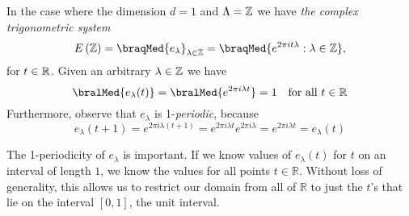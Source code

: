 \documentclass[../thesis.tex]{subfiles}
\begin{document}
\begin{example}
    In the case where the dimension $d=1$ and $\Lambda = \mathbb{Z}$ we have \emph{the complex trigonometric system}
    \begin{equation}
        E\brac{\Z} = \braqMed{e_\lambda}_{\lambda \in \Z} = \braqMed{e^{2\pi i t \lambda} : \lambda \in \Z}, %
    \end{equation}
    for $t\in \mathbb{R}$. Given an arbitrary $\lambda \in \mathbb{Z}$ we have
    \begin{equation}
        \bralMed{e_{\lambda}(t) }= \bralMed{e^{2 \pi i \lambda t}} = 1 \quad \text{for all } t\in \R
    \end{equation}
    Furthermore, observe that $e_\lambda$ is 1-\emph{periodic}, because
    \begin{equation}
        e_\lambda(t+1) = e^{2 \pi i \lambda (t+1)} = e^{2 \pi i \lambda t} e^{2 \pi i \lambda} = e^{2 \pi i \lambda t} = e_\lambda(t)
    \end{equation}

    The 1-periodicity of $e_\lambda$ is important. If we know values of $e_\lambda(t)$ for $t$ on an interval of length $1$, we know the values for all points $t\in \mathbb{R}$. Without loss of generality, this allows us to restrict our domain from all of $\mathbb{R}$ to just the $t$'s that lie on the interval $[0,1]$, the unit interval. 
\end{example}
\end{document}
